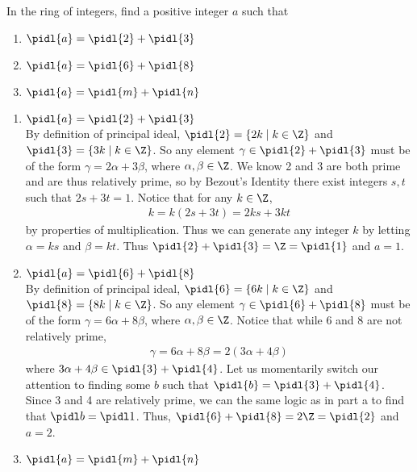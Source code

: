 \documentclass{article}
\begin{document}
In the ring of integers, find a positive integer \( a \) such that
\begin{enumerate}[label=\tbo{\alph*.}]
  \item \( \pidl{a} = \pidl{2} + \pidl{3} \)
  \item \( \pidl{a} = \pidl{6} + \pidl{8} \)
  \item \( \pidl{a} = \pidl{m} + \pidl{n} \)
\end{enumerate}

\begin{solution} %
\begin{enumerate}[label=\tbo{\alph*.}]
  \item \( \pidl{a} = \pidl{2} + \pidl{3} \) \\
    By definition of principal ideal, \( \pidl{2}=\{2k\mid k\in\Z\} \) and \( \pidl{3}=\{3k\mid k\in\Z\} \).
    So any element \(\gamma\in \pidl{2} + \pidl{3} \) must be of the form \( \gamma=2\alpha+3\beta \), where \( \alpha,\beta\in\Z \).
    We know 2 and 3 are both prime and are thus relatively prime, so by Bezout's Identity there exist integers \( s,t \) such that \( 2s+3t=1 \). Notice that for any \( k\in\Z \), \begin{align*}
      k = k(2s+3t) = 2ks+3kt
    \end{align*} by properties of multiplication.
    Thus we can generate any integer \( k \) by letting \( \alpha = ks \) and \( \beta = kt \).
    Thus \( \pidl{2}+\pidl{3} = \Z = \pidl{1} \) and \( a=1 \).
  \item \( \pidl{a} = \pidl{6} + \pidl{8} \) \\
    By definition of principal ideal, \( \pidl{6}=\{6k\mid k\in\Z\} \) and \( \pidl{8}=\{8k\mid k\in\Z\} \).
    So any element \(\gamma\in\pidl{6} + \pidl{8} \) must be of the form \( \gamma=6\alpha+8\beta \), where \( \alpha,\beta\in\Z \). Notice that while 6 and 8 are not relatively prime, \begin{align*}
      \gamma=6\alpha+8\beta= 2(3\alpha+4\beta)
    \end{align*} where \( 3\alpha+4\beta \in \pidl{3}+\pidl{4} \).
    Let us momentarily switch our attention to finding some \( b \) such that \(\pidl{b} = \pidl{3}+\pidl{4} \).
    Since 3 and 4 are relatively prime, we can the same logic as in part a to find that \( \pidl b = \pidl 1 \).
    Thus, \( \pidl{6}+\pidl{8} = 2\Z = \pidl{2} \) and \( a=2 \).
  \item \( \pidl{a} = \pidl{m} + \pidl{n} \) \\

\end{enumerate}
\end{solution}
\end{document}
